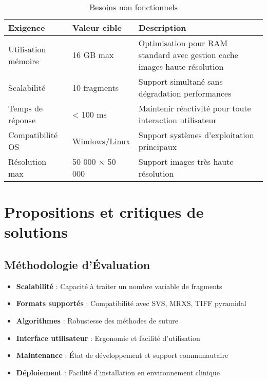 \documentclass[12pt,a4paper]{report}
\begin{document}
\begin{}
\begin{}
\begin{}
\begin{table}[H]
\centering
\begin{tabular}{|p{4cm}|p{3cm}|p{7cm}|}
\hline
\rowcolor{TableHeaderColor}
\textbf{Exigence} & \textbf{Valeur cible} & \textbf{Description} \\
\hline
Utilisation mémoire & 16 GB max & Optimisation pour RAM standard avec gestion cache images haute résolution \\
\hline
Scalabilité & 10 fragments & Support simultané sans dégradation performances \\
\hline
Temps de réponse & < 100 ms & Maintenir réactivité pour toute interaction utilisateur \\
\hline
Compatibilité OS & Windows/Linux & Support systèmes d'exploitation principaux \\
\hline
Résolution max & 50 000 × 50 000 & Support images très haute résolution \\
\hline
\end{tabular}
\caption{Besoins non fonctionnels}
\end{table}

\section{Propositions et critiques de solutions}


\subsection{Méthodologie d'Évaluation}

\begin{tcolorbox}[colback=TechBlue!10, colframe=TechBlue, title=Critères d'Évaluation]
\begin{itemize}[leftmargin=*]
    \item \textbf{Scalabilité} : Capacité à traiter un nombre variable de fragments
    \item \textbf{Formats supportés} : Compatibilité avec SVS, MRXS, TIFF pyramidal
    \item \textbf{Algorithmes} : Robustesse des méthodes de suture
    \item \textbf{Interface utilisateur} : Ergonomie et facilité d'utilisation
    \item \textbf{Maintenance} : État de développement et support communautaire
    \item \textbf{Déploiement} : Facilité d'installation en environnement clinique
\end{itemize}
\end{tcolorbox}


\end{}
\end{}
\end{}
\end{document}
